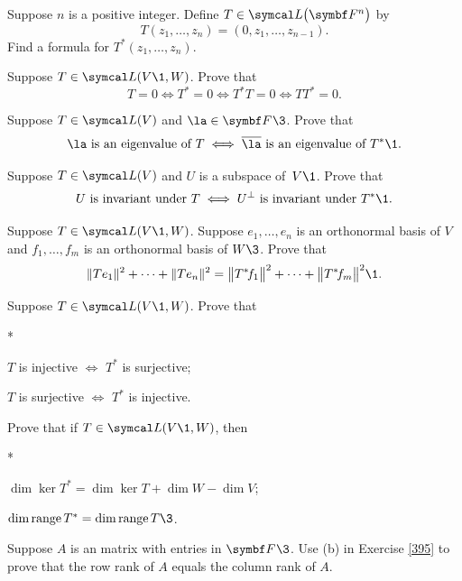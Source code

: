 \begin{exercises}

\exercise
Suppose $n$ is a positive integer.  Define $T \in \L\paren[\big]{\F{n}}$ by
\[
T(z_1, \dots, z_n) = (0, z_1, \dots, z_{n-1}).
\]
Find a formula for $T^*(z_1, \dots, z_n)$.


\exercise
Suppose $T \in \L(V\1, W)$. Prove that
\[
T = 0 \iff T^* = 0 \iff T^* T = 0 \iff T T^* = 0.
\]
\exercisedisplayend


\exercise
Suppose $T \in \L(V)$ and $\la \in \F{}\3$.  Prove that \label{259}
\[
\la \text{ is an eigenvalue of } T \iff \bar{\la} \text{ is an eigenvalue of } T^*\1.
\]
\exercisedisplayend


\exercise
Suppose $T \in \L(V)$ and $U$ is a subspace of~$V\1$.  Prove that \label{348}
\[
U \text{ is invariant under } T \iff U^\perp \text{ is invariant under } T^*\1.
\]
\exercisedisplayend


\exercise
Suppose $T \in \L(V\1, W)$. Suppose $e_1, \ldots, e_n$ is an orthonormal basis of $V$ and $f_1, \ldots, f_m$ is an orthonormal basis of $W\3$. Prove that\label{6sumT2}
\[
\norm{Te_1}^2 + \cdots + \norm{Te_n}^2 = \norm[\big]{T^* \! f_1}^2 + \cdots + \norm[\big]{T^* \! f_m}^2\1.
\]


\exercise
Suppose $T \in \L(V\1, W)$. Prove that
\begin{subtheorem}*
\item
$T$ is injective $\iff$ $T^*$ is surjective;

\item
$T$ is surjective $\iff$ $T^*$ is injective.
\end{subtheorem}
\exercisesubtheoremend


\exercise
Prove that if $T \in \L(V\1, W)$, then \label{395}
\begin{subtheorem}*
\item
$\dim \ker T^* = \dim \ker T + \dim W - \dim V$;
\item
$\dim \ran T^* = \dim \ran T\3$.
\end{subtheorem}
\exercisesubtheoremend


\exercise
Suppose $A$ is an  matrix with entries in $\F{}\3$. Use (b) in Exercise \ref{395} to prove that the row rank of $A$ equals the column rank of $A$.\label{7rank}



\end{exercises}
